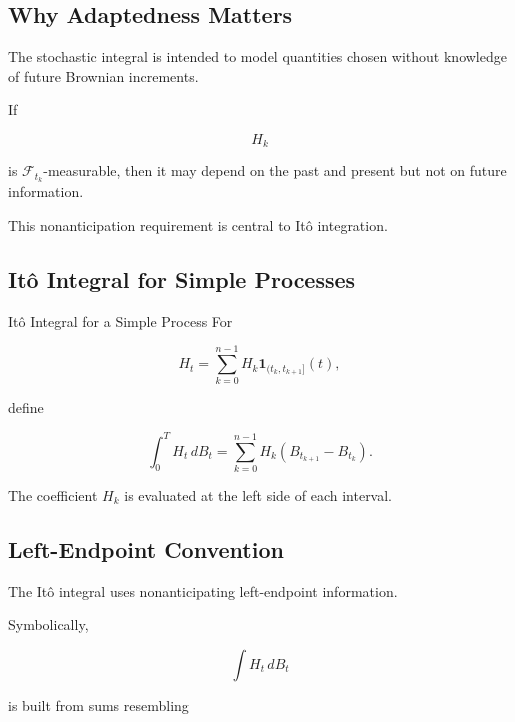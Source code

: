 \subsection{Why Adaptedness Matters}
\label{subsec:why-adaptedness-ito}

The stochastic integral is intended to model quantities chosen without
knowledge of future Brownian increments.

If

\[
H_k
\]

is \(\mathcal{F}_{t_k}\)-measurable, then it may depend on the past and
present but not on future information.

This nonanticipation requirement is central to It\^o integration.

\subsection{It\^o Integral for Simple Processes}
\label{subsec:ito-integral-simple}

\begin{definitionbox}{It\^o Integral for a Simple Process}
For

\[
H_t
=
\sum_{k=0}^{n-1}
H_k
\mathbf{1}_{(t_k,t_{k+1}]}(t),
\]

define

\[
\boxed{
\int_0^T
H_t\,dB_t
=
\sum_{k=0}^{n-1}
H_k
\left(
B_{t_{k+1}}-B_{t_k}
\right).
}
\]
\end{definitionbox}

The coefficient \(H_k\) is evaluated at the left side of each interval.

\subsection{Left-Endpoint Convention}
\label{subsec:left-endpoint-ito}

The It\^o integral uses nonanticipating left-endpoint information.

Symbolically,

\[
\int H_t\,dB_t
\]

is built from sums resembling

